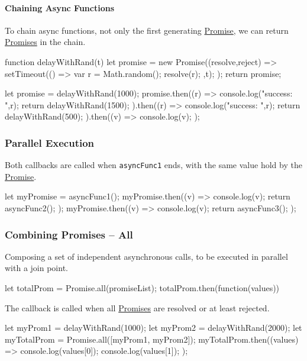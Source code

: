 \paragraph{Chaining Async Functions}\label{par:rs_chaining_async_functions} %
To chain async functions, not only the first generating \hyperref[def:promises]{Promise}, we can return \hyperref[def:promises]{Promises} in the chain.
\begin{codeblock}[js]{}
    function delayWithRand(t){
        let promise = new Promise((resolve,reject) => {
            setTimeout(() => {
                var r = Math.random();
                resolve(r);
            },t);
        });
        return promise;
    }

    let promise = delayWithRand(1000);
    promise.then((r) => {
        console.log("success: ",r);
        return delayWithRand(1500);
    }).then((r) => {
        console.log("success: ",r);
        return delayWithRand(500);
    }).then((v) => {
        console.log(v);
    });
\end{codeblock}
%
\subsubsection{Parallel Execution}\label{sub:rs_pr_parallel_execution} %
Both callbacks are called when \texttt{asyncFunc1} ends, with the same value hold by the \hyperref[def:promises]{Promise}.
\begin{codeblock}[js]{}
    let myPromise = asyncFunc1();
    myPromise.then((v) => {
        console.log(v);
        return asyncFunc2();
    });
    myPromise.then((v) => {
        console.log(v);
        return asyncFunc3();
    });
\end{codeblock}
%
\subsubsection{Combining Promises -- All}\label{sub:rs_combining_promises_all} %
Composing a set of independent asynchronous calls, to be executed in parallel with a join point.
\begin{codeblock}[js]{}
    let totalProm = Promise.all(promiseList);
    totalProm.then(function(values){})
\end{codeblock}
The callback is called when all \hyperref[def:promises]{Promises} are resolved or at least rejected.
\begin{example}{}{}
    \begin{codeblock}[js]{}
    let myProm1 = delayWithRand(1000);
    let myProm2 = delayWithRand(2000);
    let myTotalProm = Promise.all([myProm1, myProm2]);
    myTotalProm.then((values) => {
        console.log(values[0]);
        console.log(values[1]);
    });
    \end{codeblock}
\end{example}
%
